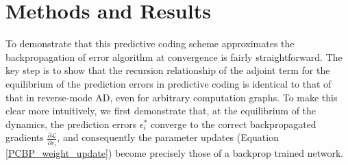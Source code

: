 \section{Methods and Results}

To demonstrate that this predictive coding scheme approximates the backpropagation of error algorithm at convergence is fairly straightforward. The key step is to show that the recursion relationship of the adjoint term for the equilibrium of the prediction errors in predictive coding is identical to that of that in reverse-mode AD, even for arbitrary computation graphs. To make this clear more intuitively, we first demonstrate that, at the equilibrium of the dynamics, the prediction errors $\epsilon^*_i$ converge to the correct backpropagated gradients $\frac{\partial \mathcal{L}}{\partial v_i}$, and consequently the parameter updates (Equation \ref{PCBP_weight_update}) become precisely those of a backprop trained network.

